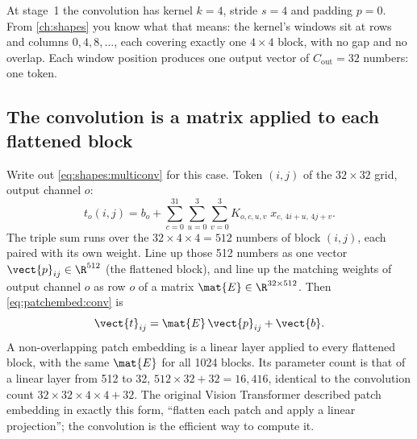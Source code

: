 At stage~1 the convolution has kernel $k=4$, stride $s=4$ and padding $p=0$. From \cref{ch:shapes} you
know what that means: the kernel's windows sit at rows and columns $0, 4, 8, \dots$, each covering
exactly one $4\times4$ block, with no gap and no overlap. Each window position produces one output
vector of $C_{\text{out}} = 32$ numbers: one token.

\subsection{The convolution is a matrix applied to each flattened block}

Write out \cref{eq:shapes:multiconv} for this case. Token $(i,j)$ of the $32\times32$ grid, output
channel $o$:
\begin{equation}\label{eq:patchembed:conv}
t_{o}(i,j) = b_o + \sum_{c=0}^{31}\sum_{u=0}^{3}\sum_{v=0}^{3} K_{o,c,u,v}\; x_{c,\,4i+u,\,4j+v}.
\end{equation}
The triple sum runs over the $32\times4\times4 = 512$ numbers of block $(i,j)$, each paired with its own
weight. Line up those 512 numbers as one vector $\vect{p}_{ij}\in\R^{512}$ (the flattened block), and line
up the matching weights of output channel $o$ as row $o$ of a matrix $\mat{E}\in\R^{32\times512}$. Then
\cref{eq:patchembed:conv} is
\begin{equation}\label{eq:patchembed:linear}
\vect{t}_{ij} = \mat{E}\,\vect{p}_{ij} + \vect{b}.
\end{equation}
A non-overlapping patch embedding is a linear layer applied to every flattened block, with the same
$\mat{E}$ for all 1024 blocks. Its parameter count is that of a linear layer from 512 to 32,
$512\times32 + 32 = 16{,}416$, identical to the convolution count $32\times32\times4\times4 + 32$.
The original Vision Transformer \citep{dosovitskiy2021image} described patch embedding in exactly this
form, ``flatten each patch and apply a linear projection''; the convolution is the efficient way to
compute it.

